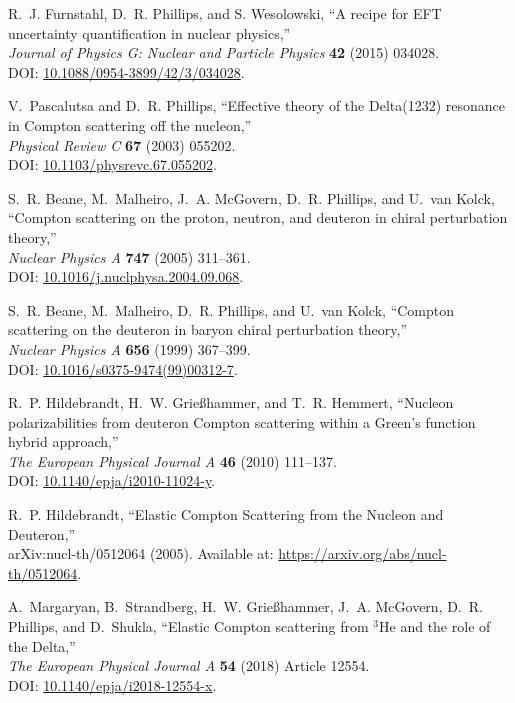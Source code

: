 \documentclass[12pt]{article}
\newcommand{\3}{\ss}
\numberwithin{equation}{section}
\begin{document}
\begin{thebibliography}{44}
R.~J. Furnstahl, D.~R. Phillips, and S. Wesolowski, 
``A recipe for EFT uncertainty quantification in nuclear physics,''\\ 
\textit{Journal of Physics G: Nuclear and Particle Physics} \textbf{42} (2015) 034028.\\ 
DOI: \href{http://dx.doi.org/10.1088/0954-3899/42/3/034028}{10.1088/0954-3899/42/3/034028}.

V.~Pascalutsa and D.~R. Phillips, 
``Effective theory of the Delta(1232) resonance in Compton scattering off the nucleon,''\\ 
\textit{Physical Review C} \textbf{67} (2003) 055202.\\ 
DOI: \href{http://dx.doi.org/10.1103/physrevc.67.055202}{10.1103/physrevc.67.055202}.

S.~R. Beane, M.~Malheiro, J.~A. McGovern, D.~R. Phillips, and U.~van Kolck, 
``Compton scattering on the proton, neutron, and deuteron in chiral perturbation theory,''\\ 
\textit{Nuclear Physics A} \textbf{747} (2005) 311–361.\\ 
DOI: \href{http://dx.doi.org/10.1016/j.nuclphysa.2004.09.068}{10.1016/j.nuclphysa.2004.09.068}.

S.~R. Beane, M.~Malheiro, D.~R. Phillips, and U.~van Kolck, 
``Compton scattering on the deuteron in baryon chiral perturbation theory,''\\ 
\textit{Nuclear Physics A} \textbf{656} (1999) 367–399.\\ 
DOI: \href{http://dx.doi.org/10.1016/s0375-9474(99)00312-7}{10.1016/s0375-9474(99)00312-7}.

R.~P. Hildebrandt, H.~W. Grießhammer, and T.~R. Hemmert, 
``Nucleon polarizabilities from deuteron Compton scattering within a Green’s function hybrid approach,''\\ 
\textit{The European Physical Journal A} \textbf{46} (2010) 111–137.\\ 
DOI: \href{http://dx.doi.org/10.1140/epja/i2010-11024-y}{10.1140/epja/i2010-11024-y}.

R.~P. Hildebrandt, 
``Elastic Compton Scattering from the Nucleon and Deuteron,''\\ 
arXiv:nucl-th/0512064 (2005). Available at: \url{https://arxiv.org/abs/nucl-th/0512064}.

A.~Margaryan, B.~Strandberg, H.~W. Grießhammer, J.~A. McGovern, D.~R. Phillips, and D.~Shukla, 
``Elastic Compton scattering from $^3$He and the role of the Delta,''\\ 
\textit{The European Physical Journal A} \textbf{54} (2018) Article 12554.\\ 
DOI: \href{http://dx.doi.org/10.1140/epja/i2018-12554-x}{10.1140/epja/i2018-12554-x}.


\end{thebibliography}
\end{document}
